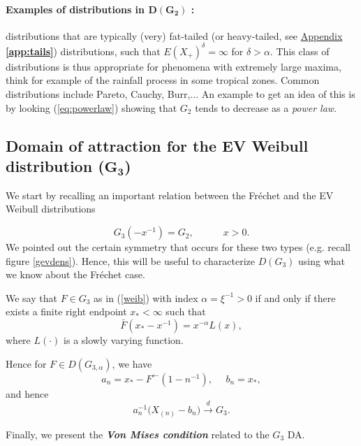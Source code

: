 \paragraph*{Examples of distributions in $\boldsymbol{D(G_{2})}$ :} distributions that are typically (very) fat-tailed (or heavy-tailed, see  \hyperref[app:tails]{Appendix \textbf{\ref{app:tails}}}) distributions, such that $E(X_+)^{\delta}=\infty$ for $\delta>\alpha$. This class of distributions is thus appropriate for phenomena with extremely large maxima, think for example of the rainfall process in some tropical zones. Common distributions include Pareto, Cauchy, Burr,$\dots$
An example to get an idea of this is by looking (\ref{eq:powerlaw})
showing that $G_{2}$ tends to decrease as a \emph{power law}.


\subsection*{Domain of attraction for the EV Weibull distribution ($\mathbf{G_{3}}$) }

We start by recalling an important relation between the Fréchet and the EV Weibull distributions 

\begin{equation*}
G_3(-x^{-1})=G_2, \qquad\quad x>0.
\end{equation*}
We pointed out the certain symmetry that occurs for these two types (e.g. recall figure \ref{gevdens}). Hence, this will be useful to characterize $D(G_3)$ using what we know about the Fréchet case.

\begin{theorem}
We say that $F\in G_{3}$ as in (\ref{weib}) with index $\alpha=\xi^{-1}>0$ if and only if there exists a finite right endpoint $x_*<\infty$ such that 
\begin{equation}
\bar{F}(x_*-x^{-1})=x^{-\alpha}L(x),
\end{equation}
where $L(\cdot)$ is a slowly varying function.
\end{theorem}
Hence for $F\in D(G_{3,\alpha})$, we have 
\begin{equation*}
a_n=x_*-F^{\leftarrow}(1-n^{-1}), \ \  \ \ \ \ b_n=x_*,
\end{equation*}
and hence
\begin{equation*}
a^{-1}_n\Big(X_{(n)}-b_n\Big)\stackrel{d}{\rightarrow}G_{3}.
\end{equation*}

Finally, we present the \emph{\textbf{Von Mises condition}} related to the $G_{3}$ DA. 

